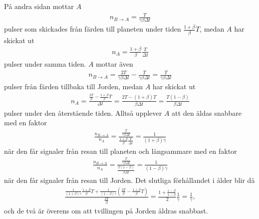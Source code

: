 På andra sidan mottar $A$
\begin{align*}
	n_{B\to A} = \frac{T}{\gamma\beta\Delta t}
\end{align*}
pulser som skickades från färden till planeten under tiden $\frac{1 + \beta}{\beta}T$, medan $A$ har skickat ut
\begin{align*}
	n_{A} = \frac{1 + \beta}{\beta}\frac{T}{\Delta t}
\end{align*}
pulser under samma tiden. $A$ mottar även
\begin{align*}
	n_{B\to A} = \frac{2T}{\gamma\beta\Delta t} - \frac{T}{\gamma\beta\Delta t} = \frac{T}{\gamma\beta\Delta t}
\end{align*}
pulser från färden tillbaka till Jorden, medan $A$ har skickat ut
\begin{align*}
	n_{A} = \frac{\frac{2T}{\beta} - \frac{1 + \beta}{\beta}T}{\Delta t} = \frac{2T - (1 + \beta)T}{\beta\Delta t} = \frac{T(1 - \beta)}{\beta\Delta t}
\end{align*}
pulser under den återstående tiden. Alltså upplever $A$ att den äldas snabbare med en faktor
\begin{align*}
	\frac{n_{B\to A}}{n_{A}} = \frac{\frac{T}{\gamma\beta\Delta t}}{\frac{1 + \beta}{\beta}\frac{T}{\Delta t}} = \frac{1}{(1 + \beta)\gamma}
\end{align*}
när den får signaler från resan till planeten och långsammare med en faktor
\begin{align*}
	\frac{n_{B\to A}}{n_{A}} = \frac{\frac{T}{\gamma\beta\Delta t}}{\frac{T(1 - \beta)}{\beta\Delta t}} = \frac{1}{(1 - \beta)\gamma}
\end{align*}
när den får signaler från resan till Jorden. Det slutliga förhållandet i ålder blir då
\begin{align*}
	\frac{\frac{1}{(1 + \beta)\gamma}\frac{1 + \beta}{\beta}T + \frac{1}{(1 - \beta)\gamma}(\frac{2T}{\beta} - \frac{1 + \beta}{\beta}T)}{\frac{2T}{\beta}} = \frac{1 + \frac{1 - \beta}{1 - \beta}}{2}\frac{1}{\gamma} = \frac{1}{\gamma},
\end{align*}
och de två är överens om att tvillingen på Jorden åldras snabbast.

